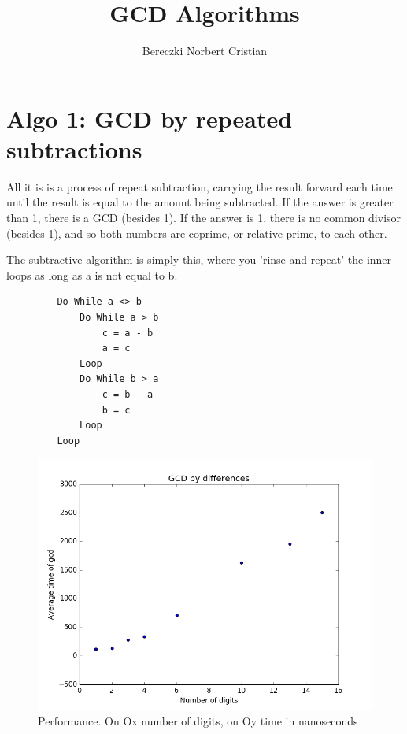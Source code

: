 \documentclass{article}
\begin{document}


\title{GCD Algorithms}
\author{Bereczki Norbert Cristian}
\maketitle

\section{Algo 1: GCD by repeated subtractions}

All it is is a process of repeat subtraction, carrying the result forward each time until the result is equal to the amount being subtracted. If the answer is greater than 1, there is a GCD (besides 1). If the answer is 1, there is no common divisor (besides 1), and so both numbers are coprime, or relative prime, to each other.

The subtractive algorithm is simply this, where you 'rinse and repeat' the inner loops as long as a is not equal to b.
\begin{lstlisting}
         Do While a <> b
             Do While a > b
                 c = a - b
                 a = c
             Loop
             Do While b > a
                 c = b - a
                 b = c
             Loop
         Loop
\end{lstlisting}

\begin{figure}[H]
\caption{Performance. On Ox number of digits, on Oy time in nanoseconds}
\centering
\includegraphics{GCDdifference}
\end{figure}
\end{document}
